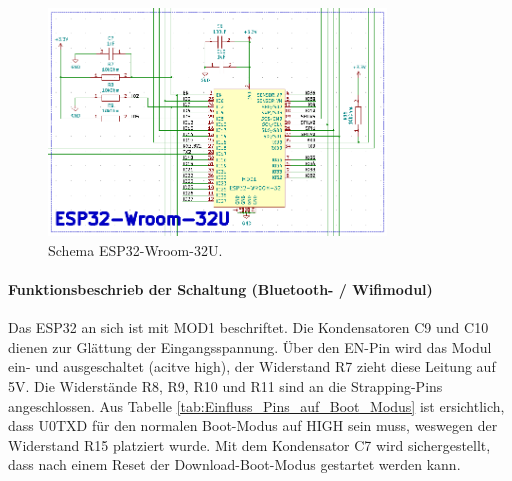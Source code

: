 \begin{figure}[H]
	\centering
	\includegraphics[width=0.8\textwidth]{graphics/Schema_ESP32}
	\caption{Schema ESP32-Wroom-32U.}
	\label{fig:Schema_ESP32}
\end{figure}

\paragraph{Funktionsbeschrieb der Schaltung (Bluetooth- / Wifimodul)}\mbox{}

Das ESP32 an sich ist mit MOD1 beschriftet. Die Kondensatoren C9 und C10 dienen zur Glättung der Eingangsspannung. Über den EN-Pin wird das Modul ein- und ausgeschaltet (acitve high), der Widerstand R7 zieht diese Leitung auf 5V. Die Widerstände R8, R9, R10 und R11 sind an die Strapping-Pins angeschlossen.
Aus Tabelle \ref{tab:Einfluss_Pins_auf_Boot_Modus} ist ersichtlich, dass U0TXD für den normalen Boot-Modus auf HIGH sein muss, weswegen der Widerstand R15 platziert wurde. Mit dem Kondensator C7 wird sichergestellt, dass nach einem Reset der Download-Boot-Modus gestartet werden kann.


